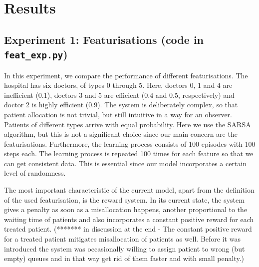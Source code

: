 \documentclass[11point]{article}
\begin{document}
%
%



\section{Results}

\subsection{Experiment 1: Featurisations (code in \texttt{feat\_exp.py})}

In this experiment, we compare the performance of different featurisations. The hospital has six doctors, of types 0 through 5. Here, doctors 0, 1 and 4 are inefficient (0.1), doctors 3 and 5 are efficient (0.4 and 0.5, respectively) and doctor 2 is highly efficient (0.9). The system is deliberately complex, so that patient allocation is not trivial, but still intuitive in a way for an observer. Patients of different types arrive with equal probability. Here we use the SARSA algorithm, but this is not a significant choice since our main concern are the featurisations. Furthermore, the learning process consists of 100 episodes with 100 steps each. The learning process is repeated 100 times for each feature so that we can get consistent data. This is essential since our model incorporates a certain level of randomness.

The most important characteristic of the current model, apart from the definition of the used featurisation, is the reward system. In its current state, the system gives a penalty as soon as a misallocation happens, another proportional to the waiting time of patients and also incorporates a constant positive reward for each treated patient. (******* in discussion at the end  - The constant positive reward for a treated patient mitigates misallocation of patients as well. Before it was introduced the system was occasionally willing to assign patient to wrong (but empty)
queues and in that way get rid of them faster and with small penalty.)
\end{document}
